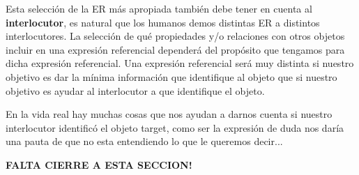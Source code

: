 %

Esta selecci\'on de la ER m\'as apropiada tambi\'en debe tener en cuenta al \textbf {interlocutor}, es natural que los humanos demos distintas ER a distintos interlocutores.
La selecci\'on de qu\'e propiedades y/o relaciones con otros objetos incluir en una expresi\'on referencial depender\'a del prop\'osito que tengamos para dicha expresi\'on referencial. Una expresi\'on referencial ser\'a muy distinta si nuestro objetivo es dar la m\'inima informaci\'on que identifique al objeto que si nuestro objetivo es ayudar al interlocutor a que identifique el objeto.

En la vida real hay muchas cosas que nos ayudan a darnos cuenta si nuestro interlocutor identific\'o el objeto target, como ser la expresi\'on de duda nos dar\'ia una pauta de que no esta entendiendo lo que le queremos decir...

\textbf{FALTA CIERRE A ESTA SECCION!}

